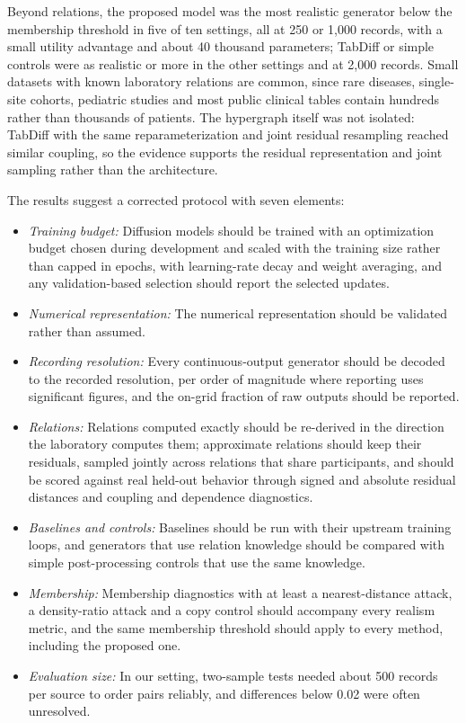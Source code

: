 \documentclass[conference]{IEEEtran}
\begin{document}
Beyond relations, the proposed model was the most realistic generator below the membership threshold in five of ten settings, all at 250 or 1,000 records, with a small utility advantage and about 40 thousand parameters; TabDiff or simple controls were as realistic or more in the other settings and at 2,000 records. Small datasets with known laboratory relations are common, since rare diseases, single-site cohorts, pediatric studies and most public clinical tables contain hundreds rather than thousands of patients. The hypergraph itself was not isolated: TabDiff with the same reparameterization and joint residual resampling reached similar coupling, so the evidence supports the residual representation and joint sampling rather than the architecture.

The results suggest a corrected protocol with seven elements:
\begin{itemize}
\item \textit{Training budget:} Diffusion models should be trained with an optimization budget chosen during development and scaled with the training size rather than capped in epochs, with learning-rate decay and weight averaging, and any validation-based selection should report the selected updates.
\item \textit{Numerical representation:} The numerical representation should be validated rather than assumed.
\item \textit{Recording resolution:} Every continuous-output generator should be decoded to the recorded resolution, per order of magnitude where reporting uses significant figures, and the on-grid fraction of raw outputs should be reported.
\item \textit{Relations:} Relations computed exactly should be re-derived in the direction the laboratory computes them; approximate relations should keep their residuals, sampled jointly across relations that share participants, and should be scored against real held-out behavior through signed and absolute residual distances and coupling and dependence diagnostics.
\item \textit{Baselines and controls:} Baselines should be run with their upstream training loops, and generators that use relation knowledge should be compared with simple post-processing controls that use the same knowledge.
\item \textit{Membership:} Membership diagnostics with at least a nearest-distance attack, a density-ratio attack and a copy control should accompany every realism metric, and the same membership threshold should apply to every method, including the proposed one.
\item \textit{Evaluation size:} In our setting, two-sample tests needed about 500 records per source to order pairs reliably, and differences below 0.02 were often unresolved.
\end{itemize}
\end{document}
